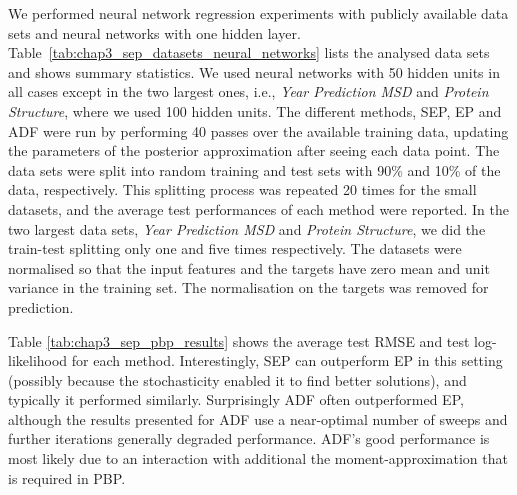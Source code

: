 We performed neural network regression experiments with publicly available data sets and neural networks with one hidden layer.  Table~\ref{tab:chap3_sep_datasets_neural_networks} lists the analysed data sets and shows summary statistics.  We used neural networks with 50 hidden units in all cases except in the two largest ones, i.e., \emph{Year Prediction
MSD} and \emph{Protein Structure}, where we used 100 hidden units. The different methods, SEP, EP and ADF were run by performing 40 passes over the available training data, updating the parameters of the posterior approximation after seeing each data point.  The data sets were split into random training and test sets with 90\% and 10\% of the data, respectively. This splitting process was repeated 20 times for the small datasets, and the average test performances of each method were reported. In the two largest data sets, \emph{Year Prediction MSD} and \emph{Protein Structure}, we did the train-test splitting only one and five times respectively. The datasets were normalised so that the input features and the targets have zero mean and unit variance in the training set. The normalisation on the targets was removed for prediction.

Table \ref{tab:chap3_sep_pbp_results} shows the average test RMSE and test log-likelihood for each method. Interestingly, SEP can outperform EP in this setting (possibly because the stochasticity enabled it to find better solutions), and typically it performed similarly. Surprisingly ADF often outperformed EP, although the results presented for ADF use a near-optimal number of sweeps and further iterations generally degraded performance. ADF's good performance is most likely due to an interaction with additional the moment-approximation that is required in PBP.

